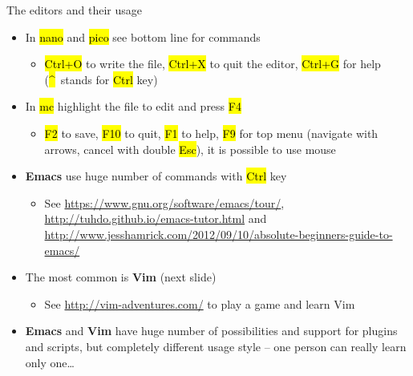 \documentclass[compress, ucs, xelatex, 11pt, xcolor=svgnames,
  hyperref={
    bookmarks=true,
    unicode=true,
    colorlinks=true,
    pdftitle={Linux, command line and MetaCentrum},
    plainpages=false,
    pdfauthor={Vojtech Zeisek},
    pdfsubject={Course about use of Linux command line, writing shell scripts and using MetaCentrum of CESNET},
    pdfcreator={XeLaTeX},
    pdfkeywords={Linux, GNU, BASH, shell, command line, MetaCentrum},
    linkcolor=DarkRed,
    anchorcolor=DarkBlue,
    citecolor=Indigo,
    filecolor=NavyBlue,
    menucolor=DarkMagenta,
    urlcolor=DarkBlue,
    pdftex},
  url={hyphens, lowtilde} %
  ]{beamer}
\renewcommand{\texttt}[1]{\hl{\ttfamily #1}}
\begin{document}
\begin{frame}{The editors and their usage}
  \begin{itemize}
    \item In \texttt{nano} and \texttt{pico} see bottom line for commands
    \begin{itemize}
      \item \texttt{Ctrl+O} to write the file, \texttt{Ctrl+X} to quit the editor, \texttt{Ctrl+G} for help (\texttt{\textasciicircum}~stands for \texttt{Ctrl} key)
    \end{itemize}
    \item In \texttt{mc} highlight the file to edit and press \texttt{F4}
    \begin{itemize}
      \item \texttt{F2} to save, \texttt{F10} to quit, \texttt{F1} to help, \texttt{F9} for top menu (navigate with arrows, cancel with double \texttt{Esc}), it is possible to use mouse
    \end{itemize}
    \item \textbf{Emacs} use huge number of commands with \texttt{Ctrl} key
    \begin{itemize}
      \item See \url{https://www.gnu.org/software/emacs/tour/}, \url{http://tuhdo.github.io/emacs-tutor.html} and \url{http://www.jesshamrick.com/2012/09/10/absolute-beginners-guide-to-emacs/}
    \end{itemize}
    \item The most common is \textbf{Vim} (next slide)
    \begin{itemize}
      \item See \url{http://vim-adventures.com/} to play a game and learn Vim
    \end{itemize}
    \item \textbf{Emacs} and \textbf{Vim} have huge number of possibilities and support for plugins and scripts, but completely different usage style -- one person can really learn only one\ldots
  \end{itemize}
\end{frame}
\end{document}

